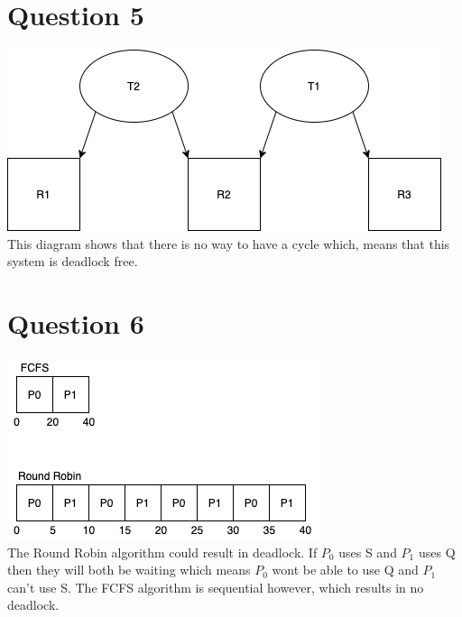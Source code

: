 \documentclass[11pt]{article}
\begin{document}
\section*{Question 5}
\includegraphics[scale=0.5]{COMS352HW6Q5}\\
This diagram shows that there is no way to have a cycle which,
means that this system is deadlock free.
\section*{Question 6}
\includegraphics[scale=0.5]{COMS352HW6Q6}\\
The Round Robin algorithm could result in deadlock. If $P_0$ 
uses S and $P_1$ uses Q then they will both be waiting which 
means $P_0$ wont be able to use Q and $P_1$ can't use S. The 
FCFS algorithm is sequential however, which results in no deadlock.
\end{document}
